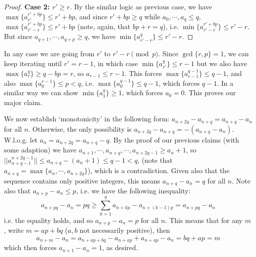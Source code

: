 \documentclass[11pt,a4paper]{article}
\begin{document}
\begin{enumerate}
\begin{proof}
			\textbf{Case 2: $r' \ge r$}. 
			By the similar logic as previous case, we have 
			$\max\{a_{r'}^{r'+bp}\}\le r'+bp$, 
			and since $r'+bp\ge q$ while 
			$a_0, \cdots, a_q\le q$, 
			$\max\{a_{r'-r}^{r'+bp}\}\le r'+bp$
			(note, again, that $bp+r=q$), 
			i.e. 
			$\min\{a_{r'-r}^{r'+bp}\}\le r'-r$. 
			But since $a_{q+1}, \cdots, a_{q+p}\ge q$, 
			we have 
			$\min\{a_{r'-r}^{q}\}\le r'-r$. 
		\end{proof}
		In any case we are going from $r'$ to $r'-r\pmod{p}$. 
		Since $\gcd\{r, p\} = 1$, 
		we can keep iterating until $r'=r-1$, 
		in which case $\min\{a_{r'}^q\}\le r - 1$ but we also have $\max\{a_r^q\}\ge q - bp = r$, 
		so $a_{r - 1}\le r - 1$. 
		This forces $\max\{a_{r-1}^{q-1}\}\le q-1$, 
		and also $\max\{a_0^{r-1}\}\le p < q$, 
		i.e. $\max\{a_0^{q-1}\}\le q-1$, 
		which forces $q - 1$. 
		In a similar way we can show $\min\{a_1^q\}\ge 1$, 
		which forces $a_0=0$. 
		This proves our major claim. 
		
		We now establish `monotonicity' in the following form: 
		$a_{n+2q}-a_{n+q}=a_{n+q}-a_n$ for all $n$. 
		Otherwise, the only possibility is $a_{n+2q}-a_{n+q}=-(a_{n+q}-a_n)$. 
		W.l.o.g. let $a_n=a_{n+2q}=a_{n+q}-q$. 
		By the proof of our previous claims (with some adaption) we have $a_{n+1}, \cdots, a_{n+q}, \cdots, a_{n+2q-1}\ge a_n+1$, 
		so 
		$||a_{n+q-1}^{n+2q-1}||\le a_{n+q} - (a_n+1)\le q-1< q$, 
		(note that $a_{n+q}=\max\{a_n, \cdots, a_{n+2q}\}$), 
		which is a contradiction. 
		Given also that the sequence contains only positive integers, 
		this means $a_{n+q}-a_n=q$ for all $n$.
		Note also that $a_{n+p}-a_n\le p$, i.e. we have the following inequality: 
		\[
		a_{n+pq}-a_n = pq
		\ge \sum_{k=1}^q a_{n+kp} - a_{n+(k-1)p}
		=a_{n+pq}-a_n
		\]
		i.e. the equality holds, and so $a_{n+p}-a_n=p$ for all $n$. 
		This means that for any $m$, write $m = ap+bq$ ($a, b$ not necessarily positive), then 
		\[
		a_{n+m}-a_n
		=a_{n+ap+bq} - a_{n+ap} + a_{n+ap}-a_n
		=bq+ap=m
		\]
		which then forces $a_{n+1}-a_n=1$, as desired. 
	\end{enumerate}
    
\end{document}
